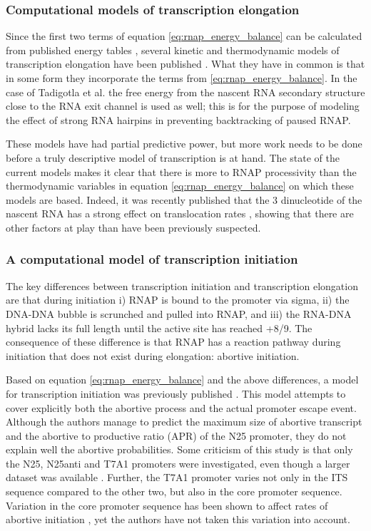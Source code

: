 \subsubsection{Computational models of transcription elongation}
Since the first two terms of equation \eqref{eq:rnap_energy_balance} can be
calculated from published energy tables \cite{wu_temperature_2002,
santalucia_thermodynamics_2004}, several kinetic and thermodynamic models of
transcription elongation have been published
\cite{tadigotla_thermodynamic_2006-1, bai_sequence-dependent_2004,
guajardo_model_1997}. What they have in common is that in some form they
incorporate the terms from \eqref{eq:rnap_energy_balance}. In the case of
Tadigotla et al. \cite{tadigotla_thermodynamic_2006-1} the free energy from the
nascent RNA secondary structure close to the RNA exit channel is used as well;
this is for the purpose of modeling the effect of strong RNA hairpins in
preventing backtracking of paused RNAP.

These models have had partial predictive power, but more work needs to be done
before a truly descriptive model of transcription is at hand. The state of the
current models makes it clear that there is more to RNAP processivity than the
thermodynamic variables in equation \eqref{eq:rnap_energy_balance} on which
these models are based. Indeed, it was recently published that the 3\p
dinucleotide of the nascent RNA has a strong effect on translocation rates
\cite{hein_rna_2011}, showing that there are other factors at play than have
been previously suspected.

\subsubsection{A computational model of transcription initiation}
The key differences between transcription initiation and transcription
elongation are that during initiation i) RNAP is bound to the promoter via
sigma, ii) the DNA-DNA bubble is scrunched and pulled into RNAP, and iii) the
RNA-DNA hybrid lacks its full length until the active site has reached +8/9.
The consequence of these difference is that RNAP has a reaction pathway during
initiation that does not exist during elongation: abortive initiation.

Based on equation \eqref{eq:rnap_energy_balance} and the above differences, a
model for transcription initiation was previously published
\cite{xue_kinetic_2008}. This model attempts to cover explicitly both the
abortive process and the actual promoter escape event. Although the authors
manage to predict the maximum size of abortive transcript and the abortive to
productive ratio (APR) of the N25 promoter, they do not explain well the
abortive probabilities. Some criticism of this study is that only the N25,
N25anti and T7A1 promoters were investigated, even though a larger dataset was
available \cite{hsu_initial_2006}. Further, the T7A1 promoter varies not only
in the ITS sequence compared to the other two, but also in the core promoter
sequence. Variation in the core promoter sequence has been shown to affect
rates of abortive initiation \cite{vo_vitro_2003-1}, yet the authors have not
taken this variation into account.

